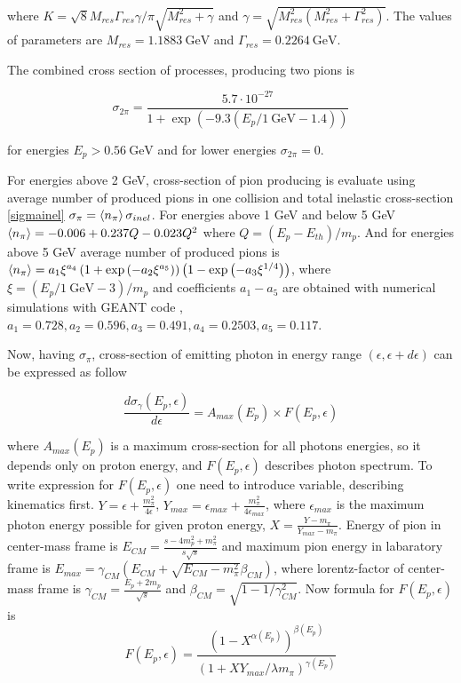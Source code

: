 where $K = \sqrt{8}M_{res}\Gamma_{res}\gamma/\pi\sqrt{M_{res}^2+\gamma}$ and $\gamma = \sqrt{M_{res}^2\left(M_{res}^2+\Gamma_{res}^2\right)}$. The values of parameters are $M_{res} = 1.1883~\text{GeV}$ and $\Gamma_{res} = 0.2264~\text{GeV}$.

The combined cross section of processes, producing two pions is

\begin{equation}
	\sigma_{2\pi}=\frac{5.7\cdot10^{-27}}{1+\exp(-9.3\left(E_p/1~\text{GeV} - 1.4\right))}
\end{equation}

for energies $E_p > 0.56~\text{GeV}$ and for lower energies $\sigma_{2\pi}=0$.

For energies above 2 GeV, cross-section of pion producing is evaluate using average number of produced pions in one collision and total inelastic cross-section \ref{sigmainel} $\sigma_{\pi} = \braket{n_{\pi}} \sigma_{inel}$. For energies above 1 GeV and below 5 GeV $\braket{n_{\pi}} = -0.006 + 0.237 Q - 0.023 Q^2$ where $Q = \left(E_p - E_{th}\right)/m_p$. And for energies above 5 GeV average number of produced pions is $\braket{n_{\pi}} = a_1 \xi^{a_4}\left(1 + \exp\left(-a_2\xi^{a_5}\right)\right)\left(1-\exp\left(-a_3\xi^{1/4}\right)\right)$, where $\xi = \left(E_p/1~\text{GeV} - 3\right)/m_p$ and coefficients $a_1-a_5$ are obtained with numerical simulations with GEANT code \cite{AllisonGeant2006}, $a_1 = 0.728, a_2 = 0.596, a_3 = 0.491, a_4 = 0.2503, a_5 = 0.117$.

Now, having $\sigma_{\pi}$, cross-section of emitting photon in energy range $\left(\epsilon, \epsilon + d\epsilon\right)$ can be expressed as follow

\begin{equation}
	\frac{d\sigma_{\gamma}\left(E_p, \epsilon\right)}{d\epsilon} = A_{max}\left(E_p\right)\times F\left(E_p, \epsilon\right)
\end{equation}

where $A_{max}(E_p)$ is a maximum cross-section for all photons energies, so it depends only on proton energy, and $F\left(E_p,\epsilon\right)$ describes photon spectrum. To write expression for $F\left(E_p, \epsilon\right)$ one need to introduce variable, describing kinematics first. $Y=\epsilon+\frac{m_{\pi}^2}{4 \epsilon}$, $Y_{max}=\epsilon_{max}+\frac{m_{\pi}^2}{4 \epsilon_{max}}$, where $\epsilon_{max}$ is the maximum photon energy possible for given proton energy, $X=\frac{Y-m_{\pi}}{Y_{max}-m_{\pi}}$. Energy of pion in center-mass frame is $E_{CM}=\frac{s-4m_p^2+m_{\pi}^2}{s\sqrt{s}}$ and maximum pion energy in labaratory frame is $E_{max}=\gamma_{CM}\left(E_{CM}+\sqrt{E_{CM}-m_{\pi}^2}\beta_{CM}\right)$, where lorentz-factor of center-mass frame is $\gamma_{CM}=\frac{E_p+2m_p}{\sqrt{s}}$ and $\beta_{CM}=\sqrt{1-1/\gamma_{CM}^2}$. Now formula for $F\left(E_p,\epsilon\right)$ is
\begin{equation}
	F\left(E_p,\epsilon\right) = \frac{\left(1-X^{\alpha(E_p)}\right)^{\beta(E_p)}}{\left(1+X Y_{max}/\lambda m_{\pi}\right)^{\gamma(E_p)}}
\end{equation}

